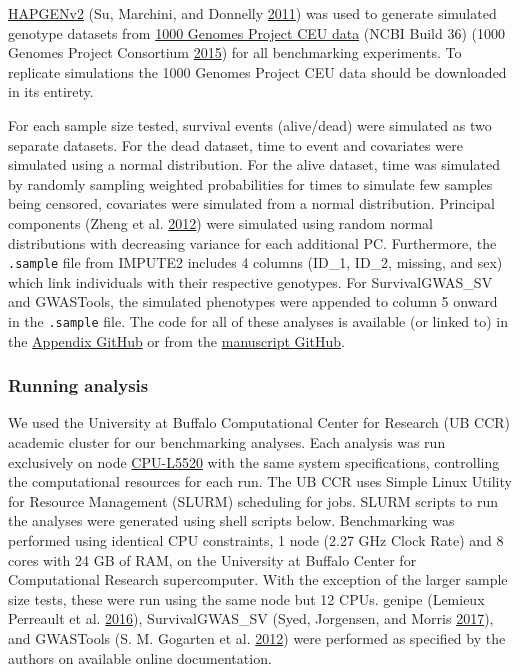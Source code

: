 \documentclass[]{DissertateOSU}
\begin{document}
\href{http://mathgen.stats.ox.ac.uk/genet\%20dics_software/hapgen/hapgen2.html}{HAPGENv2}
(Su, Marchini, and Donnelly \protect\hyperlink{ref-hapgen2}{2011}) was
used to generate simulated genotype datasets from
\href{https://mathgen.stats.ox.ac.uk/impute/impute_v1.html\#Using_IMPUTE_with_the_HapMap_Data}{1000
Genomes Project CEU data} (NCBI Build 36) (1000 Genomes Project
Consortium \protect\hyperlink{ref-1000genomes}{2015}) for all
benchmarking experiments. To replicate simulations the 1000 Genomes
Project CEU data should be downloaded in its entirety.

For each sample size tested, survival events (alive/dead) were simulated
as two separate datasets. For the dead dataset, time to event and
covariates were simulated using a normal distribution. For the alive
dataset, time was simulated by randomly sampling weighted probabilities
for times to simulate few samples being censored, covariates were
simulated from a normal distribution. Principal components (Zheng et al.
\protect\hyperlink{ref-snprelate}{2012}) were simulated using random
normal distributions with decreasing variance for each additional PC.
Furthermore, the \texttt{.sample} file from IMPUTE2 includes 4 columns
(ID\_1, ID\_2, missing, and sex) which link individuals with their
respective genotypes. For SurvivalGWAS\_SV and GWASTools, the simulated
phenotypes were appended to column 5 onward in the \texttt{.sample}
file. The code for all of these analyses is available (or linked to) in
the
\href{https://github.com/aarizvi/dissertation/tree/master/code/chapter3}{Appendix
GitHub} or from the
\href{https://github.com/suchestoncampbelllab/gwasurvivr_manuscript}{manuscript
GitHub}.

\subsubsection{Running analysis}\label{running-analysis}

We used the University at Buffalo Computational Center for Research (UB
CCR) academic cluster for our benchmarking analyses. Each analysis was
run exclusively on node
\href{https://www.buffalo.edu/ccr/support/research_facilities/general_compute.html}{CPU-L5520}
with the same system specifications, controlling the computational
resources for each run. The UB CCR uses Simple Linux Utility for
Resource Management (SLURM) scheduling for jobs. SLURM scripts to run
the analyses were generated using shell scripts below. Benchmarking was
performed using identical CPU constraints, 1 node (2.27 GHz Clock Rate)
and 8 cores with 24 GB of RAM, on the University at Buffalo Center for
Computational Research supercomputer. With the exception of the larger
sample size tests, these were run using the same node but 12 CPUs.
genipe (Lemieux Perreault et al. \protect\hyperlink{ref-genipe}{2016}),
SurvivalGWAS\_SV (Syed, Jorgensen, and Morris
\protect\hyperlink{ref-survivalgwas_sv}{2017}), and GWASTools (S. M.
Gogarten et al. \protect\hyperlink{ref-gwastools}{2012}) were performed
as specified by the authors on available online documentation.
\end{document}
